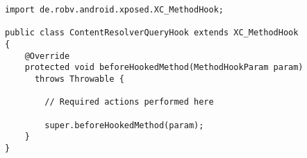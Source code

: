 \begin{lstlisting}[caption=beforeHookedMethod example, label=beforeHookedMethodListing]
import de.robv.android.xposed.XC_MethodHook;

public class ContentResolverQueryHook extends XC_MethodHook
{
    @Override
    protected void beforeHookedMethod(MethodHookParam param)
      throws Throwable {

        // Required actions performed here

        super.beforeHookedMethod(param);
    }
}
\end{lstlisting}